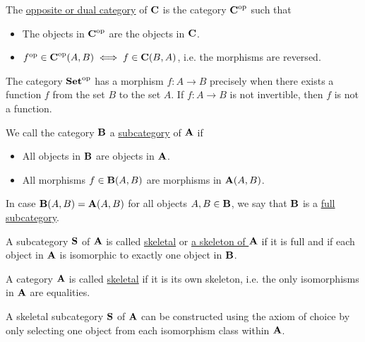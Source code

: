 \begin{definition}\label{def:opposite_category}\cite[construction 1.1.9]{Leinster2014}
  The \uline{opposite or dual category} of $\operatorname{\mathbf{C}}$ is the category $\operatorname{\mathbf{C}}^{\operatorname{op}}$ such that
  \begin{itemize}
    \item The objects in $\operatorname{\mathbf{C}}^{\operatorname{op}}$ are the objects in $\operatorname{\mathbf{C}}$.
    \item $f^{\operatorname{op}} \in \operatorname{\mathbf{C}}^{\operatorname{op}}(A, B) \iff f \in \operatorname{\mathbf{C}}(B, A)$, i.e. the morphisms are reversed.
  \end{itemize}
\end{definition}

\begin{example}
  The category $\operatorname{\mathbf{Set}}^{\operatorname{op}}$ has a morphism $f: A \to B$ precisely when there exists a function $f$ from the set $B$ to the set $A$. If $f: A \to B$ is not invertible, then $f$ is not a function.
\end{example}

\begin{definition}\label{def:subcategory}\cite[definition 1.2.18]{Leinster2014}
  We call the category $\operatorname{\mathbf{B}}$ a \uline{subcategory} of $\operatorname{\mathbf{A}}$ if
  \begin{itemize}
    \item All objects in $\operatorname{\mathbf{B}}$ are objects in $\operatorname{\mathbf{A}}$.
    \item All morphisms $f \in \operatorname{\mathbf{B}}(A, B)$ are morphisms in $\operatorname{\mathbf{A}}(A, B)$.
  \end{itemize}

  In case $\operatorname{\mathbf{B}}(A, B) = \operatorname{\mathbf{A}}(A, B)$ for all objects $A, B \in \operatorname{\mathbf{B}}$, we say that $\operatorname{\mathbf{B}}$ is a \uline{full subcategory}.
\end{definition}

\begin{definition}\label{def:skeletal_category}\cite[91]{MacLane1994}
  A subcategory $\operatorname{\mathbf{S}}$ of $\operatorname{\mathbf{A}}$ is called \uline{skeletal} or \uline{a skeleton of $\operatorname{\mathbf{A}}$} if it is full and if each object in $\operatorname{\mathbf{A}}$ is isomorphic to exactly one object in $\operatorname{\mathbf{B}}$.

  A category $\operatorname{\mathbf{A}}$ is called \uline{skeletal} if it is its own skeleton, i.e. the only isomorphisms in $\operatorname{\mathbf{A}}$ are equalities.
\end{definition}

\begin{note}\label{note:skeletal_subcategory_exists}
   A skeletal subcategory $\operatorname{\mathbf{S}}$ of $\operatorname{\mathbf{A}}$ can be constructed using the axiom of choice by only selecting one object from each isomorphism class within $\operatorname{\mathbf{A}}$.
\end{note}

